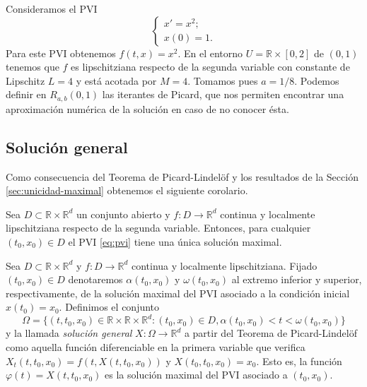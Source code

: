 \documentclass{article}
\begin{document}
\begin{ex}
  Consideramos el PVI
  \begin{equation}
    \begin{cases}
      x' = x^2; \\ x(0) = 1.
    \end{cases}
  \end{equation}
  Para este PVI obtenemos $f(t,x) = x^2$. En el entorno $U = \mathbb{R} \times [0,2]$ de $(0,1)$
  tenemos que $f$ es lipschitziana respecto de la segunda variable con constante de Lipschitz
  $L = 4$ y está acotada por $M = 4$. Tomamos pues $a = 1/8$. Podemos definir en $R_{a,b}(0,1)$ las
  iterantes de Picard, que nos permiten encontrar una aproximación numérica de la solución en caso
  de no conocer ésta.
\end{ex}

\subsection{Solución general}

Como consecuencia del Teorema de Picard-Lindelöf y los resultados de la Sección
\ref{sec:unicidad-maximal} obtenemos el siguiente corolario.

\begin{cor} \label{cor:picard:maximal} Sea $D \subset \mathbb{R} \times \mathbb{R}^d$ un conjunto
  abierto y $f : D \to \mathbb{R}^d$ continua y localmente lipschitziana respecto de la segunda
  variable. Entonces, para cualquier $(t_0, x_0) \in D$ el PVI \eqref{eq:pvi} tiene una única
  solución maximal.
\end{cor}

\begin{definition}
  Sea $D \subset \mathbb{R} \times \mathbb{R}^d$ y $f \colon D \to \mathbb{R}^d$ continua y localmente
  lipschitziana. Fijado $(t_0, x_0) \in D$ denotaremos $\alpha(t_0, x_0)$ y $\omega(t_0, x_0)$ al
  extremo inferior y superior, respectivamente, de la solución maximal del PVI asociado a la
  condición inicial $x(t_0) = x_0$. Definimos el conjunto
  \[\Omega = \{(t, t_0, x_0) \in \mathbb{R}\times\mathbb{R}\times\mathbb{R}^d : (t_0, x_0) \in D,
    \alpha(t_0, x_0) < t < \omega(t_0, x_0)\}\] y la llamada \emph{solución general}
  $X: \Omega \to \mathbb{R}^d$ a partir del Teorema de Picard-Lindelöf como aquella función
  diferenciable en la primera variable que verifica $X_t(t, t_0, x_0) = f(t, X(t, t_0, x_0))$ y
  $X(t_0, t_0, x_0) = x_0$. Esto es, la función $\varphi(t) = X(t, t_0, x_0)$ es la solución maximal
  del PVI asociado a $(t_0, x_0)$.
\end{definition}
\end{document}
